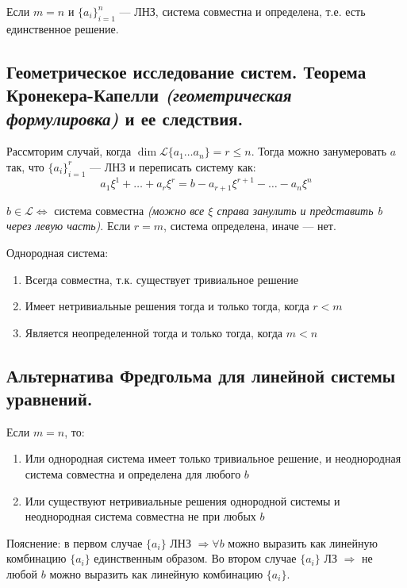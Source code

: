 \begin{theorem}
    Если $m=n$ и $\{a_i\}_{i=1}^n$ --- ЛНЗ, система совместна и определена, т.е. есть единственное решение.
\end{theorem}
\subsection{Геометрическое исследование систем. Теорема Кронекера-Капелли \textit{(геометрическая формулировка)} и ее следствия.}
Рассмторим случай, когда $\dim\mathcal{L}\{a_1\ldots a_n\}=r\leq n$. Тогда можно занумеровать $a$ так, что $\{a_i\}_{i=1}^r$ --- ЛНЗ и переписать систему как: $$a_1\xi^1+\ldots+a_r\xi^r=b-a_{r+1}\xi^{r+1}-\ldots-a_n\xi^n$$
\begin{theorem}
    $b\in\mathcal L \Leftrightarrow$ система совместна \textit{(можно все $\xi$ справа занулить и представить b через левую часть)}. Если $r=m$, система определена, иначе --- нет.
\end{theorem}
\begin{corollary}
    Однородная система:
    \begin{enumerate}
        \item Всегда совместна, т.к. существует тривиальное решение
        \item Имеет нетривиальные решения тогда и только тогда, когда $r<m$
        \item Является неопределенной тогда и только тогда, когда $m<n$
    \end{enumerate}
\end{corollary}
\subsection{Альтернатива Фредгольма для линейной системы уравнений.}
\begin{theorem}
    Если $m=n$, то:
    \begin{enumerate}
        \item Или однородная система имеет только тривиальное решение, и неоднородная система совместна и определена для любого $b$
        \item Или существуют нетривиальные решения однородной системы и неоднородная система совместна не при любых $b$
    \end{enumerate}
    Пояснение: в первом случае $\{a_i\}$ ЛНЗ $\Rightarrow \forall b$ можно выразить как линейную комбинацию $\{a_i\}$ единственным образом. Во втором случае $\{a_i\}$ ЛЗ $\Rightarrow$ не любой $b$ можно выразить как линейную комбинацию $\{a_i\}$.
\end{theorem}
